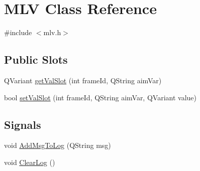 \hypertarget{class_m_l_v}{
\section{MLV Class Reference}
\label{class_m_l_v}
}


{\ttfamily \#include $<$mlv.h$>$}

\subsection*{Public Slots}
\begin{DoxyCompactItemize}
\item 
QVariant \hyperlink{class_m_l_v_ad6333f43519659f4442a133df5a0e4b4}{getValSlot} (int frameId, QString aimVar)
\item 
bool \hyperlink{class_m_l_v_aecbe0684744927216a8beacd9a804fdc}{setValSlot} (int frameId, QString aimVar, QVariant value)
\end{DoxyCompactItemize}
\subsection*{Signals}
\begin{DoxyCompactItemize}
\item 
void \hyperlink{class_m_l_v_a7e302abc856535449f9d6feb16b88078}{AddMsgToLog} (QString msg)
\item 
void \hyperlink{class_m_l_v_ac4ae3db23dd2ae2ba6817ed268e76c4c}{ClearLog} ()
\end{DoxyCompactItemize}
